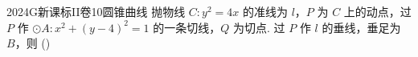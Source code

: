 
\begin{problem}{2024}{G}{新课标II卷}{10}{圆锥曲线}
抛物线 $C: y^2=4x$ 的准线为 $l$，$P$ 为 $C$ 上的动点，过 $P$ 作 $\odot A: x^2+(y-4)^2=1$ 的一条切线，$Q$ 为切点. 过 $P$ 作 $l$ 的垂线，垂足为 $B$，则
(\hspace{1cm})
\begin{choices}
\end{choices}
\end{problem}